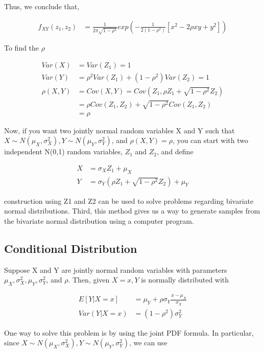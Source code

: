 Thus, we conclude that,

\begin{align*}
	f_{XY}(z_1, z_2) &= \frac{1}{2 \pi \sqrt{1-\rho^2}} exp \left( -\frac{1}{2 (1- \rho^2)} [x^2 -2 \rho xy + y^2] \right)
\end{align*}


To find the $\rho$

\begin{align*}
	Var(X) &= Var(Z_1) =1 \\
	Var(Y) &= \rho^2 Var(Z_1) + (1- \rho^2) Var(Z_2) = 1 \\
	\rho(X,Y) &= Cov(X, Y) = Cov(Z_1, \rho Z_1 + \sqrt{1-\rho^2} Z_2) \\
	&= \rho Cov(Z_1, Z_2) + \sqrt{1-\rho^2} Cov(Z_1, Z_2) \\
	&= \rho
\end{align*}

Now, if you want two jointly normal random variables X and Y such that $X \sim N(\mu_X, \sigma^2_X), Y \sim N(\mu_Y, \sigma^2_Y)$, and $\rho(X,Y)= \rho$, you can start with two independent N(0,1) random variables, $Z_1$ and $Z_2$, and define

\begin{align*}
	X &= \sigma_X Z_1 + \mu_X \\
	Y &= \sigma_Y \left(\rho Z_1 + \sqrt{1-\rho^2} Z_2 \right)  + \mu_Y
\end{align*}

construction using Z1 and Z2 can be used to solve problems regarding bivariate normal distributions. Third, this method gives us a way to generate samples from the bivariate normal distribution using a computer program. 

\subsection{Conditional Distribution}

Suppose X and Y are jointly normal random variables with parameters $\mu_X, \sigma^2_X, \mu_Y, \sigma^2_Y$, and $ \rho $. Then, given $X=x, Y$ is normally distributed with

\begin{align*}
	E[Y|X=x] &= \mu_Y + \rho \sigma_Y \frac{x-\mu_X}{\sigma_X} \\
	Var(Y|X=x) &= (1- \rho^2) \sigma^2_Y
\end{align*}

One way to solve this problem is by using the joint PDF formula. In particular, since $X \sim N(\mu_X, \sigma^2_X), Y \sim N(\mu_Y, \sigma^2_Y)$, we can use

